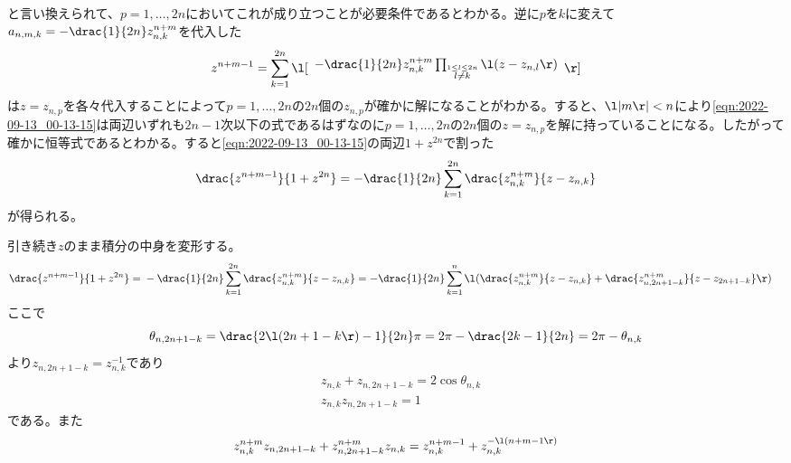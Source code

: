 \documentclass[a4j,uplatex,dvipdfmx,10pt]{jsarticle}
\def\autoleft{\l}
\def\autoright{\r}
\begin{document}
\begin{prf}[]
\begin{prf}
\begin{equation}
\label{eqn:2022-09-13_00-08-13}
\end{equation}
と言い換えられて、\(p=1,\ldots ,2n \)においてこれが成り立つことが必要条件であるとわかる。逆に\(p \)を\(k \)に変えて\(a_{n,m,k}=-\drac{1}{2n}z_{n,k}^{n+m} \)を代入した
\begin{equation}
z^{n+m-1}=\sum_{k=1}^{2n} \autoleft[\begin{array}{cc}
-\drac{1}{2n}z_{n,k}^{n+m}\prod_{\stackrel{1\leq l\leq 2n}{l \neq k}}^{}\l(z-z_{n,l}\r)
\end{array}\autoright]
\label{eqn:2022-09-13_00-13-15}
\end{equation}
は\(z=z_{n,p} \)を各々代入することによって\(p=1,\ldots ,2n \)の\(2n \)個の\(z_{n,p} \)が確かに解になることがわかる。すると、\(\l|m\r|<n \)により\eqref{eqn:2022-09-13_00-13-15}は両辺いずれも\(2n-1 \)次以下の式であるはずなのに\(p=1,\ldots ,2n \)の\(2n \)個の\(z=z_{n,p} \)を解に持っていることになる。したがって確かに恒等式であるとわかる。すると\eqref{eqn:2022-09-13_00-13-15}の両辺\(1+z^{2n} \)で割った
\begin{equation}
\drac{z^{n+m-1}}{1+z^{2n}}=-\drac{1}{2n}\sum_{k=1}^{2n} \drac{z_{n,k}^{n+m}}{z-z_{n,k}}
\label{eqn:2022-09-13_00-14-55}
\end{equation}
が得られる。
\end{prf}
引き続き\(z \)のまま積分の中身を変形する。
\begin{equation}\begin{split}
\drac{z^{n+m-1}}{1+z^{2n}} ={} & -\drac{1}{2n}\sum_{k=1}^{2n} \drac{z_{n,k}^{n+m}}{z-z_{n,k}} = -\drac{1}{2n}\sum_{k=1}^{n} \l(\drac{z_{n,k}^{n+m}}{z-z_{n,k}}+\drac{z_{n,2n+1-k}^{n+m}}{z-z_{2n+1-k}}\r)
\end{split}\label{eqn:2022-09-13_00-17-14}
\end{equation}
ここで
\begin{equation}
\theta _{n,2n+1-k}=\drac{2\l(2n+1-k\r)-1}{2n}\pi =2\pi -\drac{2k-1}{2n}=2\pi -\theta _{n,k}
\label{eqn:2022-09-13_00-29-39}
\end{equation}
より\(z_{n,2n+1-k}=z_{n,k}^{-1} \)であり
\begin{align}[left=\empheqlbrace\ ]
{} & z_{n,k}+z_{n,2n+1-k}=2 \cos \theta _{n,k}
\label{eqn:2022-09-13_00-32-23} \\
{} & z_{n,k}z_{n,2n+1-k}=1
\label{eqn:2022-09-13_00-31-21}
\end{align}
である。また
\begin{equation}\begin{split}
{}   & z_{n,k}^{n+m}z_{n,2n+1-k}+z_{n,2n+1-k}^{n+m}z_{n,k}=z^{n+m-1}_{n,k}+z_{n,k}^{-\l(n+m-1\r)} \\

\end{split}
\end{equation}
\end{prf}
\end{document}
